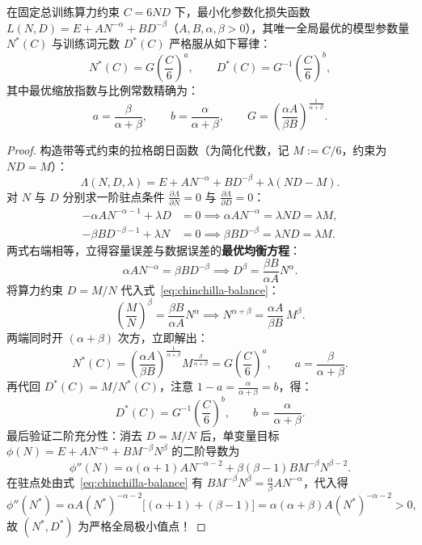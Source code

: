 \begin{thmBox}
\begin{theorem}
\label{thm:chinchilla}
在固定总训练算力约束 $C = 6 N D$ 下，最小化参数化损失函数 $L(N, D) = E + A N^{-\alpha} + B D^{-\beta}$（$A, B, \alpha, \beta > 0$），其唯一全局最优的模型参数量 $N^*(C)$ 与训练词元数 $D^*(C)$ 严格服从如下幂律：
\begin{equation}
  N^*(C) = G \left(\frac{C}{6}\right)^a,
  \qquad
  D^*(C) = G^{-1} \left(\frac{C}{6}\right)^b,
  \label{eq:chinchilla-opt}
\end{equation}
其中最优缩放指数与比例常数精确为：
\begin{equation}
  a = \frac{\beta}{\alpha + \beta}, \qquad
  b = \frac{\alpha}{\alpha + \beta}, \qquad
  G = \left(\frac{\alpha A}{\beta B}\right)^{\frac{1}{\alpha + \beta}}.
  \label{eq:chinchilla-exp}
\end{equation}
\end{theorem}
\begin{proof}
构造带等式约束的拉格朗日函数（为简化代数，记 $M := C / 6$，约束为 $N D = M$）：
\[
  \Lambda(N, D, \lambda) = E + A N^{-\alpha} + B D^{-\beta} + \lambda (N D - M).
\]
对 $N$ 与 $D$ 分别求一阶驻点条件 $\frac{\partial \Lambda}{\partial N} = 0$ 与 $\frac{\partial \Lambda}{\partial D} = 0$：
\begin{align*}
  -\alpha A N^{-\alpha - 1} + \lambda D &= 0 \implies \alpha A N^{-\alpha} = \lambda N D = \lambda M, \\
  -\beta B D^{-\beta - 1} + \lambda N &= 0 \implies \beta B D^{-\beta} = \lambda N D = \lambda M.
\end{align*}
两式右端相等，立得容量误差与数据误差的\textbf{最优均衡方程}：
\begin{equation}
  \alpha A N^{-\alpha} = \beta B D^{-\beta}
  \implies D^\beta = \frac{\beta B}{\alpha A} N^\alpha.
  \label{eq:chinchilla-balance}
\end{equation}
将算力约束 $D = M / N$ 代入式~\eqref{eq:chinchilla-balance}：
\[
  \left(\frac{M}{N}\right)^\beta = \frac{\beta B}{\alpha A} N^\alpha
  \implies N^{\alpha + \beta} = \frac{\alpha A}{\beta B}\, M^\beta.
\]
两端同时开 $(\alpha + \beta)$ 次方，立即解出：
\[
  N^*(C) = \left(\frac{\alpha A}{\beta B}\right)^{\frac{1}{\alpha + \beta}} M^{\frac{\beta}{\alpha + \beta}}
  = G \left(\frac{C}{6}\right)^a, \qquad a = \frac{\beta}{\alpha + \beta}.
\]
再代回 $D^*(C) = M / N^*(C)$，注意 $1 - a = \frac{\alpha}{\alpha + \beta} = b$，得：
\[
  D^*(C) = G^{-1} \left(\frac{C}{6}\right)^b, \qquad b = \frac{\alpha}{\alpha + \beta}.
\]
最后验证二阶充分性：消去 $D = M/N$ 后，单变量目标 $\phi(N) = E + A N^{-\alpha} + B M^{-\beta} N^{\beta}$ 的二阶导数为
\[
  \phi''(N) = \alpha(\alpha + 1) A N^{-\alpha - 2} + \beta(\beta - 1) B M^{-\beta} N^{\beta - 2}.
\]
在驻点处由式~\eqref{eq:chinchilla-balance} 有 $B M^{-\beta} N^{\beta} = \frac{\alpha}{\beta} A N^{-\alpha}$，代入得
\[
  \phi''(N^*) = \alpha A (N^*)^{-\alpha - 2}\Big[(\alpha + 1) + (\beta - 1)\Big]
  = \alpha(\alpha + \beta) A (N^*)^{-\alpha - 2} > 0,
\]
故 $(N^*, D^*)$ 为严格全局极小值点！
\end{proof}
\end{thmBox}

